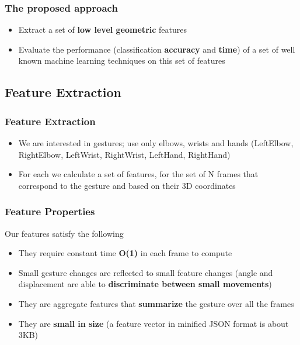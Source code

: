\begin{frame}
\frametitle{The proposed approach}

\begin{itemize}
\item Extract a set of \textbf{low level geometric} features
\item Evaluate the performance (classification \textbf{accuracy} and \textbf{time}) of a set of well known machine learning techniques on this set of features
\end{itemize}

\end{frame}

\subsection{Feature Extraction}

\begin{frame}
\frametitle{Feature Extraction}

\begin{itemize}
\item We are interested in gestures; use only elbows, wrists and hands (LeftElbow, RightElbow, LeftWrist, RightWrist, LeftHand, RightHand)
\item For each we calculate a set of features, for the set of N frames that correspond to the gesture and based on their 3D coordinates
\end{itemize}

\end{frame}

\begin{frame}
\frametitle{Feature Properties}

Our features satisfy the following

\begin{itemize}
\item They require constant time \textbf{O(1)} in each frame to compute
\item Small gesture changes are reflected to small feature changes (angle and displacement are able to \textbf{discriminate between small movements})
\item They are aggregate features that \textbf{summarize} the gesture over all the frames
\item They are \textbf{small in size} (a feature vector in minified JSON format is about 3KB)
\end{itemize}

\end{frame}

